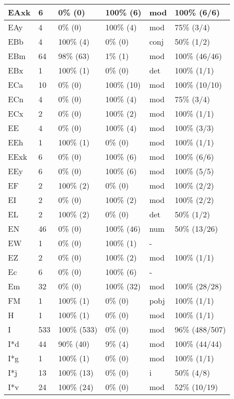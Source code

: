 \begin{figure*}
\begin{tabular}{|l|l|l|l||l|l|}
\hline
 EAxk & 6 & 0\% (0) & 100\% (6) & mod & 100\% (6/6) \\ 
\hline
 EAy & 4 & 0\% (0) & 100\% (4) & mod & 75\% (3/4) \\ 
\hline
 EBb & 4 & 100\% (4) & 0\% (0) & conj & 50\% (1/2) \\ 
\hline
 EBm & 64 & 98\% (63) & 1\% (1) & mod & 100\% (46/46) \\ 
\hline
 EBx & 1 & 100\% (1) & 0\% (0) & det & 100\% (1/1) \\ 
\hline
 ECa & 10 & 0\% (0) & 100\% (10) & mod & 100\% (10/10) \\ 
\hline
 ECn & 4 & 0\% (0) & 100\% (4) & mod & 75\% (3/4) \\ 
\hline
 ECx & 2 & 0\% (0) & 100\% (2) & mod & 100\% (1/1) \\ 
\hline
 EE & 4 & 0\% (0) & 100\% (4) & mod & 100\% (3/3) \\ 
\hline
 EEh & 1 & 100\% (1) & 0\% (0) & mod & 100\% (1/1) \\ 
\hline
 EExk & 6 & 0\% (0) & 100\% (6) & mod & 100\% (6/6) \\ 
\hline
 EEy & 6 & 0\% (0) & 100\% (6) & mod & 100\% (5/5) \\ 
\hline
 EF & 2 & 100\% (2) & 0\% (0) & mod & 100\% (2/2) \\ 
\hline
 EI & 2 & 0\% (0) & 100\% (2) & mod & 100\% (2/2) \\ 
\hline
 EL & 2 & 100\% (2) & 0\% (0) & det & 50\% (1/2) \\ 
\hline
 EN & 46 & 0\% (0) & 100\% (46) & num & 50\% (13/26) \\ 
\hline
 EW & 1 & 0\% (0) & 100\% (1) & - &  \\ 
\hline
 EZ & 2 & 0\% (0) & 100\% (2) & mod & 100\% (1/1) \\ 
\hline
 Ec & 6 & 0\% (0) & 100\% (6) & - &  \\ 
\hline
 Em & 32 & 0\% (0) & 100\% (32) & mod & 100\% (28/28) \\ 
\hline
 FM & 1 & 100\% (1) & 0\% (0) & pobj & 100\% (1/1) \\ 
\hline
 H & 1 & 100\% (1) & 0\% (0) & mod & 100\% (1/1) \\ 
\hline
 I & 533 & 100\% (533) & 0\% (0) & mod & 96\% (488/507) \\ 
\hline
 I*d & 44 & 90\% (40) & 9\% (4) & mod & 100\% (44/44) \\ 
\hline
 I*g & 1 & 100\% (1) & 0\% (0) & mod & 100\% (1/1) \\ 
\hline
 I*j & 13 & 100\% (13) & 0\% (0) & i & 50\% (4/8) \\ 
\hline
 I*v & 24 & 100\% (24) & 0\% (0) & mod & 52\% (10/19) \\ 
\hline
\end{tabular}
\end{figure*}
